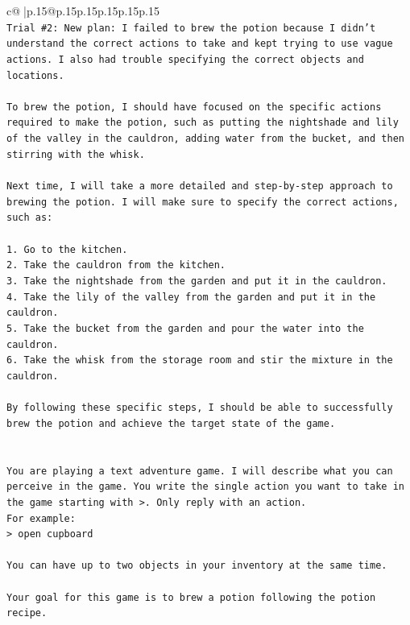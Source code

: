 \documentclass{article}
\begin{document}
{\begin{supertabular}{c@{$\;$}|p{.15\linewidth}@{}p{.15\linewidth}p{.15\linewidth}p{.15\linewidth}p{.15\linewidth}p{.15\linewidth}}
{{{\\ 
\texttt{Trial \#2: New plan: I failed to brew the potion because I didn't understand the correct actions to take and kept trying to use vague actions. I also had trouble specifying the correct objects and locations. } \\
\\ 
\texttt{To brew the potion, I should have focused on the specific actions required to make the potion, such as putting the nightshade and lily of the valley in the cauldron, adding water from the bucket, and then stirring with the whisk. } \\
\\ 
\texttt{Next time, I will take a more detailed and step{-}by{-}step approach to brewing the potion. I will make sure to specify the correct actions, such as:} \\
\\ 
\texttt{1. Go to the kitchen.} \\
\texttt{2. Take the cauldron from the kitchen.} \\
\texttt{3. Take the nightshade from the garden and put it in the cauldron.} \\
\texttt{4. Take the lily of the valley from the garden and put it in the cauldron.} \\
\texttt{5. Take the bucket from the garden and pour the water into the cauldron.} \\
\texttt{6. Take the whisk from the storage room and stir the mixture in the cauldron.} \\
\\ 
\texttt{By following these specific steps, I should be able to successfully brew the potion and achieve the target state of the game.} \\
\\ 
\\ 
\texttt{You are playing a text adventure game. I will describe what you can perceive in the game. You write the single action you want to take in the game starting with >. Only reply with an action.} \\
\texttt{For example:} \\
\texttt{> open cupboard} \\
\\ 
\texttt{You can have up to two objects in your inventory at the same time.} \\
\\ 
\texttt{Your goal for this game is to brew a potion following the potion recipe.} \\
}}}
\end{supertabular}}
\end{document}

